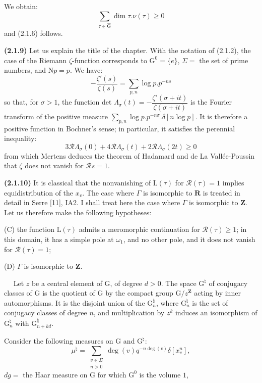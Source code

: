 \documentclass[11pt,leqno]{article}
\newcommand{\Page}[1]{\ifvmode\noindent\else\unskip\ \fi{\footnotesize\textcolor{gray}{[p.\,#1]}}\ \ignorespaces}
\begin{document}
We obtain:
\[
\sum_{\tau\in\widehat{\mathrm{G}}}\dim\tau.\nu(\tau)\geq0
\]
and (2.1.6) follows.

\textbf{(2.1.9)} Let us explain the title of the chapter. With the notation of (2.1.2), the case of the Riemann \(\zeta\)-function corresponds to \(\mathrm{G}^0=\{e\}\), \(\Sigma=\) the set of prime numbers, and \(\mathrm{N}p=p\). We have:
\[
-\frac{\zeta'(s)}{\zeta(s)}
 =\sum_{p,n}\log p.p^{-ns}
\]
so that, for \(\sigma>1\), the function det \(\Lambda_\sigma(t)=-\dfrac{\zeta'(\sigma+it)}{\zeta(\sigma+it)}\) is the Fourier transform of the positive measure \(\displaystyle\sum_{p,n}\log p.p^{-n\sigma}.\delta[n\log p]\). It is therefore a positive function in Bochner's sense; in particular, it satisfies the perennial inequality:
\[
3\mathscr{R}\Lambda_\sigma(0)
 +4\mathscr{R}\Lambda_\sigma(t)
 +2\mathscr{R}\Lambda_\sigma(2t)\geq0
\]
from which Mertens deduces the theorem of Hadamard and de La Vallée-Poussin that \(\zeta\) does not vanish for \(\mathscr{R}s=1\).

\textbf{(2.1.10)} It is classical that the nonvanishing of \(\mathrm{L}(\tau)\) for \(\mathscr{R}(\tau)=1\) implies equidistribution of the \(x_v\). The case where \(\Gamma\) is isomorphic to \(\mathbf{R}\) is treated in detail in Serre [11], IA2. I shall treat here the case where \(\Gamma\) is isomorphic to \(\mathbf{Z}\). Let us therefore make the following hypotheses:

\noindent (C) the function \(\mathrm{L}(\tau)\) admits a meromorphic continuation for \(\mathscr{R}(\tau)\geq1\); in this domain, it has a simple pole at \(\omega_1\), and no other pole, and it does not vanish for \(\mathscr{R}(\tau)=1\);

\noindent (D) \(\Gamma\) is isomorphic to \(\mathbf{Z}\).

\Page{192}
Let \(z\) be a central element of \(\mathrm{G}\), of degree \(d>0\). The space \(\mathrm{G}^{\natural}\) of conjugacy classes of \(\mathrm{G}\) is the quotient of \(\mathrm{G}\) by the compact group \(\mathrm{G}/z^{\mathbf{Z}}\) acting by inner automorphisms. It is the disjoint union of the \(\mathrm{G}_n^{\natural}\), where \(\mathrm{G}_n^{\natural}\) is the set of conjugacy classes of degree \(n\), and multiplication by \(z^k\) induces an isomorphism of \(\mathrm{G}_n^{\natural}\) with \(\mathrm{G}_{n+kd}^{\natural}\).

Consider the following measures on \(\mathrm{G}\) and \(\mathrm{G}^{\natural}\):
\[
\mu^{\natural}
 =\sum_{\substack{v\in\Sigma\\ n>0}}
   \deg(v)q^{-n\deg(v)}\delta[x_v^n],
\]
\noindent \(dg=\) the Haar measure on \(\mathrm{G}\) for which \(\mathrm{G}^0\) is the volume \(1\),
\end{document}

